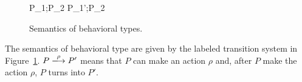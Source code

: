 


\begin{figure}[t]

\begin{minipage}[t]{0.25\textwidth}
\end{minipage}
\begin{minipage}[t]{0.34\textwidth}
\end{minipage}
\begin{minipage}[t]{0.3\textwidth}
\end{minipage}

\vspace{2mm}

\begin{minipage}{0.33\textwidth}
\end{minipage}
\begin{minipage}{0.3\textwidth}
\end{minipage}
\begin{minipage}{0.33\textwidth}
\end{minipage}

{P_{1};P_{2} \xlongrightarrow{\rho} P_{1}';P_{2}}
\caption{Semantics of behavioral types.}
\label{fig:semBTypes}
\end{figure}


The semantics of behavioral type are given by the labeled transition
system in Figure~\ref{fig:semBTypes}.  \(P \xlongrightarrow{\rho} P'\)
means that \(P\) can make an action \(\rho\) and, after \(P\) make the
action \(\rho\), \(P\) turns into \(P'\).

